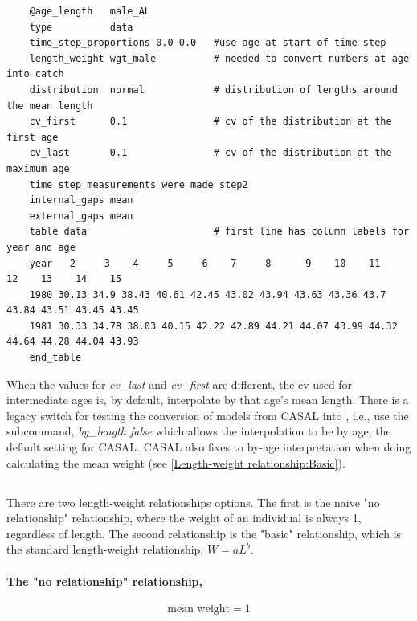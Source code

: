 {\small{\begin{verbatim}
	@age_length   male_AL
	type          data
	time_step_proportions 0.0 0.0   #use age at start of time-step
	length_weight wgt_male          # needed to convert numbers-at-age into catch
	distribution  normal            # distribution of lengths around the mean length
	cv_first      0.1               # cv of the distribution at the first age
	cv_last       0.1               # cv of the distribution at the maximum age
	time_step_measurements_were_made step2
	internal_gaps mean
	external_gaps mean
	table data                      # first line has column labels for year and age
	year   2     3    4     5     6    7     8      9    10    11    12    13    14    15
	1980 30.13 34.9 38.43 40.61 42.45 43.02 43.94 43.63 43.36 43.7 43.84 43.51 43.45 43.45
	1981 30.33 34.78 38.03 40.15 42.22 42.89 44.21 44.07 43.99 44.32 44.64 44.28 44.04 43.93
	end_table
\end{verbatim}}}

When the values for \textit{cv\_last} and \textit{cv\_first} are different, the cv used for intermediate ages is, by default, interpolate by that age's mean length. There is a legacy switch for testing the conversion of models from CASAL into \CNAME, i.e., use the subcommand, \textit{by\_length false} which allows the interpolation to be by age, the default setting for CASAL. CASAL also fixes to by-age interpretation when doing calculating the mean weight (see \ref{Length-weight relationship:Basic}).

\subsection{\label{sec:mean-weight}}

There are two length-weight relationships options. The first is the naive "no relationship" relationship, where the weight of an individual is always 1, regardless of length. The second relationship is the "basic" relationship, which is the standard length-weight relationship, $W = aL^b$.

\paragraph[None]{The "no relationship" relationship, }

\begin{equation}
  \text{mean weight}=1
\end{equation}

